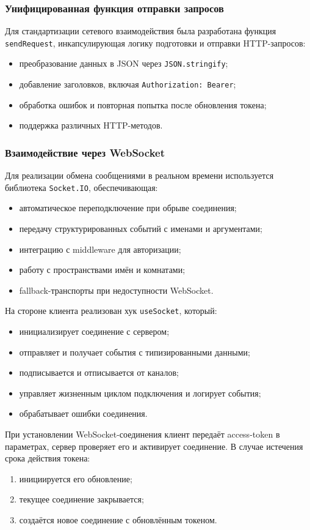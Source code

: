 \subsubsection{Унифицированная функция отправки запросов}
Для стандартизации сетевого взаимодействия была разработана функция \texttt{sendRequest}, инкапсулирующая логику подготовки и отправки HTTP-запросов:
\begin{itemize}
  \item преобразование данных в JSON через \texttt{JSON.stringify};
  \item добавление заголовков, включая \texttt{Authorization: Bearer};
  \item обработка ошибок и повторная попытка после обновления токена;
  \item поддержка различных HTTP-методов.
\end{itemize}

\subsubsection{Взаимодействие через WebSocket}
Для реализации обмена сообщениями в реальном времени используется библиотека \texttt{Socket.IO}, обеспечивающая:
\begin{itemize}
  \item автоматическое переподключение при обрыве соединения;
  \item передачу структурированных событий с именами и аргументами;
  \item интеграцию с middleware для авторизации;
  \item работу с пространствами имён и комнатами;
  \item fallback-транспорты при недоступности WebSocket.
\end{itemize}

На стороне клиента реализован хук \texttt{useSocket}, который:
\begin{itemize}
  \item инициализирует соединение с сервером;
  \item отправляет и получает события с типизированными данными;
  \item подписывается и отписывается от каналов;
  \item управляет жизненным циклом подключения и логирует события;
  \item обрабатывает ошибки соединения.
\end{itemize}

При установлении WebSocket-соединения клиент передаёт access-token в параметрах, сервер проверяет его и активирует соединение. В случае истечения срока действия токена:
\begin{enumerate}
  \item инициируется его обновление;
  \item текущее соединение закрывается;
  \item создаётся новое соединение с обновлённым токеном.
\end{enumerate}

